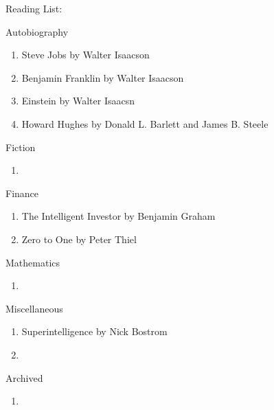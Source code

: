 \documentclass{article}
\begin{document}
\Huge Reading List: 

\hrulefill

\LARGE Autobiography

\normalsize 
    \begin{enumerate}
        \item Steve Jobs by Walter Isaacson
        \item Benjamin Franklin by Walter Isaacson
        \item Einstein by Walter Isaacsn 
        \item Howard Hughes by Donald L. Barlett and James B. Steele
    \end{enumerate}

\LARGE Fiction

\normalsize
    \begin{enumerate}
        \item 
    \end{enumerate}

\LARGE Finance

\normalsize
    \begin{enumerate}
        \item The Intelligent Investor by Benjamin Graham
        \item Zero to One by Peter Thiel
    \end{enumerate}



\LARGE Mathematics

\normalsize
    \begin{enumerate}
        \item 
    \end{enumerate}

\LARGE Miscellaneous

\normalsize
    \begin{enumerate}
        \item Superintelligence by Nick Bostrom
        \item  
    \end{enumerate}
\hrulefill



\LARGE Archived

\normalsize
    \begin{enumerate}
        \item 
    \end{enumerate}

    
\end{document}
